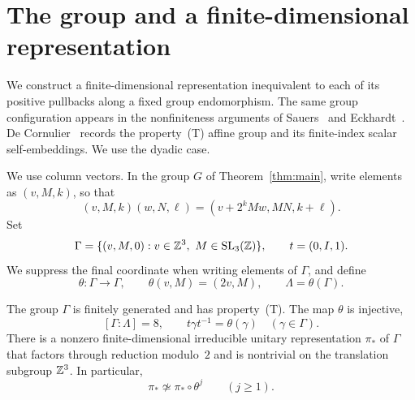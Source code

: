\section{The group and a finite-dimensional representation}
\label{sec:group}

We construct a finite-dimensional representation inequivalent to each of
its positive pullbacks along a fixed group endomorphism. The same group
configuration appears in the nonfiniteness arguments of
Sauers~\cite[Section~2.4]{Sauers2026NonMF} and
Eckhardt~\cite[Theorem~3.1 and Example~3.2]{Eckhardt2026}.
De Cornulier~\cite[Proposition~1.1 and its proof]{deCornulier2007}
records the property~(T) affine group and its finite-index scalar
self-embeddings. We use the dyadic case.

We use column vectors.  In the group $G$ of Theorem~\ref{thm:main},
write elements as $(v,M,k)$, so that
\[
 (v,M,k)(w,N,\ell)=(v+2^kMw,MN,k+\ell).
\]
Set
\[
 \Gamma=\{(v,M,0):v\in\Z^3,\ M\in\SL_3(\Z)\},
 \qquad t=(0,I,1).
\]
We suppress the final coordinate when writing elements of $\Gamma$, and
define
\[
 \theta:\Gamma\longrightarrow\Gamma,\qquad
 \theta(v,M)=(2v,M),
 \qquad \Lambda=\theta(\Gamma).
\]

\begin{lemma}\label{lem:group-data}
The group $\Gamma$ is finitely generated and has property~(T).  The map
$\theta$ is injective,
\[
 [\Gamma:\Lambda]=8,
 \qquad t\gamma t^{-1}=\theta(\gamma)\quad(\gamma\in\Gamma).
\]
There is a nonzero finite-dimensional irreducible unitary representation
$\pi_*$ of $\Gamma$ that factors through reduction modulo~$2$ and is
nontrivial on the translation subgroup $\mathbb Z^3$.  In particular,
\begin{equation}\label{eq:group-aperiodic}
 \pi_*\not\simeq\pi_*\circ\theta^j\qquad(j\geq1).
\end{equation}
\end{lemma}

